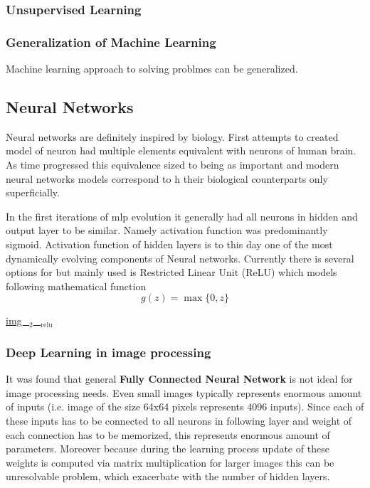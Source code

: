 \documentclass[11pt]{article}
\begin{document}
\subsubsection{Unsupervised Learning}
\label{sec:org319a16d}
\subsubsection{Generalization of Machine Learning}
\label{sec:org10ed5eb}
Machine learning approach to solving problmes can be generalized.

\subsection{Neural Networks}
\label{sec:org947b8ad}
Neural networks are definitely inspired by biology. First attempts to created model of neuron had multiple elements equivalent with neurons of human brain. As time progressed this equivalence sized to being as important and modern neural networks models correspond to h their biological counterparts only superficially.

In the first iterations of \gls{mlp} evolution it generally had all neurons in hidden and output layer to be similar. Namely activation function was predominantly sigmoid. Activation function of hidden layers is to this day one of the most dynamically evolving components of Neural networks. Currently there is several options for but mainly used is Restricted Linear Unit (ReLU) which models following mathematical function
\begin{equation}
g(z) = \max \{0,z\}
\end{equation}

\href{./img/img\_\_2\_\_relu.png}{img\_\(_{\text{2}}\)\_\(_{\text{relu}}\)}

\subsubsection{Deep Learning in image processing}
\label{sec:orge1d25cc}
It was found that general \textbf{Fully Connected Neural Network} is not ideal for image processing needs. Even small images typically represents enormous amount of inputs (i.e. image of the size 64x64 pixels represents 4096 inputs).
Since each of these inputs has to be connected to all neurons in following layer and weight of each connection has to be memorized, this represents enormous amount of parameters. Moreover because during the learning process update of these weights is computed via matrix multiplication for larger images this can be unresolvable problem, which exacerbate with the number of hidden layers.
\end{document}
